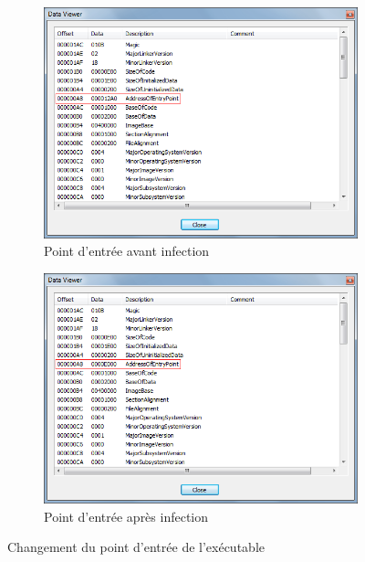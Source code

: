     \begin{figure}[H]
        \centering
        \begin{subfigure}{0.9\textwidth}
            \centering
            \includegraphics[width=\textwidth]{images/entrypoint_avant.png}
            \caption{Point d'entrée avant infection}
            \label{entrypoint_avant}
        \end{subfigure}
        \hfill
        \begin{subfigure}{0.9\textwidth}
            \centering
            \includegraphics[width=\textwidth]{images/entrypoint_after.png}
            \caption{Point d'entrée après infection}
            \label{entrypoint_apres}
        \end{subfigure}
        \hfill
        \caption{Changement du point d'entrée de l'exécutable}
        \label{entrypoint_changement}
    \end{figure}

